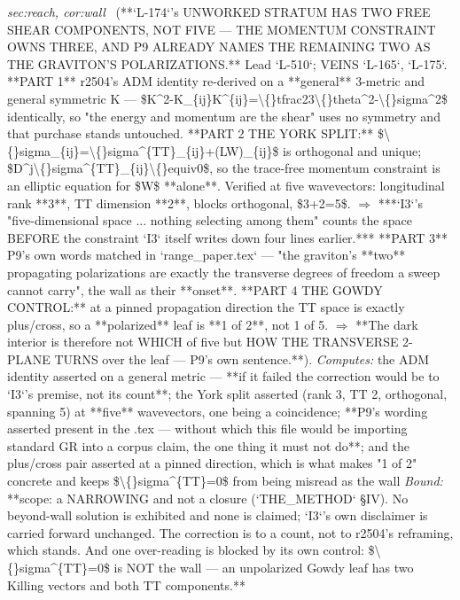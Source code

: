 \begin{description}
\textit{sec:reach, cor:wall} \ (**`L-174`'s UNWORKED STRATUM HAS TWO FREE SHEAR COMPONENTS, NOT FIVE --- THE MOMENTUM CONSTRAINT OWNS THREE, AND P9 ALREADY NAMES THE REMAINING TWO AS THE GRAVITON'S POLARIZATIONS.** Lead `L-510`; VEINS `L-165`, `L-175`. **PART 1** r2504's ADM identity re-derived on a **general** 3-metric and general symmetric K --- \$K\textasciicircum{}2-K\_\{ij\}K\textasciicircum{}\{ij\}=\textbackslash\{\}tfrac23\textbackslash\{\}theta\textasciicircum{}2-\textbackslash\{\}sigma\textasciicircum{}2\$ identically, so "the energy and momentum are the shear" uses no symmetry and that purchase stands untouched. **PART 2 THE YORK SPLIT:** \$\textbackslash\{\}sigma\_\{ij\}=\textbackslash\{\}sigma\textasciicircum{}\{TT\}\_\{ij\}+(LW)\_\{ij\}\$ is orthogonal and unique; \$D\textasciicircum{}j\textbackslash\{\}sigma\textasciicircum{}\{TT\}\_\{ij\}\textbackslash\{\}equiv0\$, so the trace-free momentum constraint is an elliptic equation for \$W\$ **alone**. Verified at five wavevectors: longitudinal rank **3**, TT dimension **2**, blocks orthogonal, \$3+2=5\$. \ensuremath{\Rightarrow} ***`I3`'s "five-dimensional space ... nothing selecting among them" counts the space BEFORE the constraint `I3` itself writes down four lines earlier.*** **PART 3** P9's own words matched in `range\_paper.tex` --- "the graviton's **two** propagating polarizations are exactly the transverse degrees of freedom a sweep cannot carry", the wall as their **onset**. **PART 4 THE GOWDY CONTROL:** at a pinned propagation direction the TT space is exactly plus/cross, so a **polarized** leaf is **1 of 2**, not 1 of 5. \ensuremath{\Rightarrow} **The dark interior is therefore not WHICH of five but HOW THE TRANSVERSE 2-PLANE TURNS over the leaf --- P9's own sentence.**). 
\emph{Computes:} the ADM identity asserted on a general metric --- **if it failed the correction would be to `I3`'s premise, not its count**; the York split asserted (rank 3, TT 2, orthogonal, spanning 5) at **five** wavevectors, one being a coincidence; **P9's wording asserted present in the .tex --- without which this file would be importing standard GR into a corpus claim, the one thing it must not do**; and the plus/cross pair asserted at a pinned direction, which is what makes "1 of 2" concrete and keeps \$\textbackslash\{\}sigma\textasciicircum{}\{TT\}=0\$ from being misread as the wall
 \emph{Bound:} **scope: a NARROWING and not a closure (`THE\_METHOD` \S{}IV). No beyond-wall solution is exhibited and none is claimed; `I3`'s own disclaimer is carried forward unchanged. The correction is to a count, not to r2504's reframing, which stands.  And one over-reading is blocked by its own control: \$\textbackslash\{\}sigma\textasciicircum{}\{TT\}=0\$ is NOT the wall --- an unpolarized Gowdy leaf has two Killing vectors and both TT components.**

\end{description}
